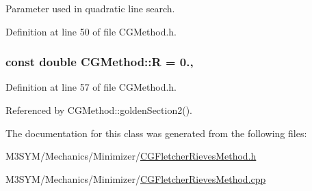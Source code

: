 Parameter used in quadratic line search. 



Definition at line 50 of file C\+G\+Method.\+h.

\hypertarget{classCGMethod_a2e7906b4b29a1b76dca43d56eaf2efac}{
\subsubsection[{R}]{\setlength{\rightskip}{0pt plus 5cm}const double C\+G\+Method\+::\+R = 0.\hspace{0.3cm}{\ttfamily [protected]}, {\ttfamily [inherited]}}}\label{classCGMethod_a2e7906b4b29a1b76dca43d56eaf2efac}


Definition at line 57 of file C\+G\+Method.\+h.



Referenced by C\+G\+Method\+::golden\+Section2().



The documentation for this class was generated from the following files\+:\begin{DoxyCompactItemize}
\item 
M3\+S\+Y\+M/\+Mechanics/\+Minimizer/\hyperlink{CGFletcherRievesMethod_8h}{C\+G\+Fletcher\+Rieves\+Method.\+h}\item 
M3\+S\+Y\+M/\+Mechanics/\+Minimizer/\hyperlink{CGFletcherRievesMethod_8cpp}{C\+G\+Fletcher\+Rieves\+Method.\+cpp}\end{DoxyCompactItemize}
